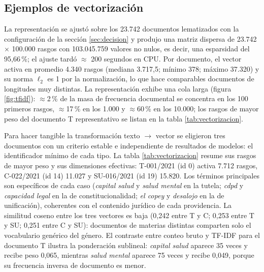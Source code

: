 \documentclass[11pt]{tg_usta}
\begin{document}
\subsection{Ejemplos de vectorización}
\label{sec:vectorizacion}
La representación se ajustó sobre los 23.742 documentos lematizados con la configuración de la sección \ref{sec:decision} y produjo una matriz dispersa de 23.742 $\times$ 100.000 rasgos con 103.045.759 valores no nulos, es decir, una esparsidad del 95,66\,\%; el ajuste tardó $\approx$ 200 segundos en CPU. Por documento, el vector activa en promedio 4.340 rasgos (mediana 3.717,5; mínimo 378; máximo 37.320) y su norma $\ell_2$ es 1 por la normalización, lo que hace comparables documentos de longitudes muy distintas. La representación exhibe una cola larga (figura \ref{fig:tfidf}): $\approx$2\,\% de la masa de frecuencia documental se concentra en los 100 primeros rasgos, $\approx$17\,\% en los 1.000 y $\approx$60\,\% en los 10.000; los rasgos de mayor peso del documento T representativo se listan en la tabla \ref{tab:vectorizacion}.

Para hacer tangible la transformación texto $\rightarrow$ vector se eligieron tres documentos con un criterio estable e independiente de resultados de modelos: el identificador mínimo de cada tipo. La tabla \ref{tab:vectorizacion} resume sus rasgos de mayor peso y sus dimensiones efectivas: T-001/2021 (id 0) activa 7.712 rasgos, C-022/2021 (id 14) 11.027 y SU-016/2021 (id 19) 15.820. Los términos principales son específicos de cada caso (\emph{capital salud} y \emph{salud mental} en la tutela; \emph{cdpd} y \emph{capacidad legal} en la de constitucionalidad; \emph{el copey} y \emph{desalojo} en la de unificación), coherentes con el contenido jurídico de cada providencia. La similitud coseno entre los tres vectores es baja (0,242 entre T y C; 0,253 entre T y SU; 0,251 entre C y SU): documentos de materias distintas comparten solo el vocabulario genérico del género. El contraste entre conteo bruto y TF-IDF para el documento T ilustra la ponderación sublineal: \emph{capital salud} aparece 35 veces y recibe peso 0,065, mientras \emph{salud mental} aparece 75 veces y recibe 0,049, porque su frecuencia inversa de documento es menor.
\end{document}
